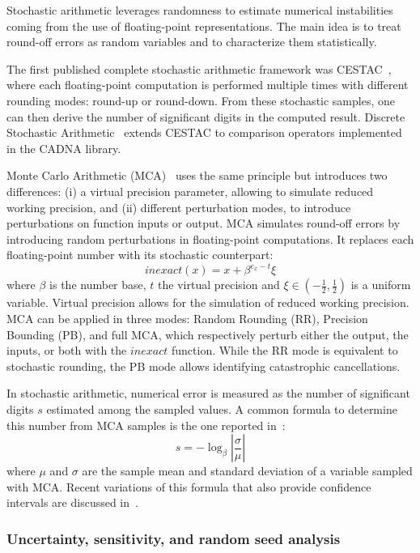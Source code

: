 \documentclass[11pt]{article}
\newcommand{\tristan}[1]{\color{orange}\textbf{From Tristan:} #1\color{black}\xspace}
\begin{document}
Stochastic arithmetic leverages randomness to estimate numerical instabilities coming from the use of floating-point representations. The main idea is to treat round-off errors 
as random variables and to characterize them statistically.

The first published complete stochastic arithmetic framework was CESTAC~\cite{vignes1993stochastic}, where each floating-point computation is performed multiple times with different rounding modes: round-up or round-down. From these stochastic samples, one can then derive the number of significant digits in the computed result. Discrete Stochastic Arithmetic~\cite{vignes2004discrete} extends CESTAC to comparison operators implemented in the CADNA library.

Monte Carlo Arithmetic (MCA)~\cite{parker1997monte} uses the same principle but introduces two differences:
(i) a virtual precision parameter, allowing to simulate reduced working precision,  and (ii) different perturbation modes, to introduce perturbations
on function inputs or output.
MCA simulates round-off errors by introducing random perturbations in floating-point computations. It replaces each floating-point number with its stochastic counterpart:
\[
inexact(x) =  x + \beta^{e_x - t}\xi
\]
where $\beta$ is the number base, $t$ the virtual precision and $\xi \in (-\frac{1}{2},\frac{1}{2})$ is a uniform variable.
Virtual precision allows for the simulation of reduced working precision.
MCA can be applied in three modes: Random Rounding (RR), Precision Bounding (PB), and full MCA, which respectively perturb either the output, the inputs, or both with the $inexact$ function. While the RR mode is equivalent to stochastic rounding, the PB mode allows identifying catastrophic cancellations.

In stochastic arithmetic, numerical error is measured as the number of significant digits $s$ estimated among the sampled values. A common formula to determine this number from MCA samples is the one reported in~\cite{parker1997monte}:
\begin{equation}
s = -\log_{\beta}{ \left| \dfrac{\sigma}{\mu} \right|} \label{eq:sig-digits}
\end{equation}
where $\mu$ and $\sigma$ are the sample mean and standard deviation of a variable sampled with MCA.  Recent variations of this formula that also provide confidence intervals are discussed in~\cite{sohier2018confidence}.

\subsubsection{Uncertainty, sensitivity, and random seed analysis}
\end{document}
